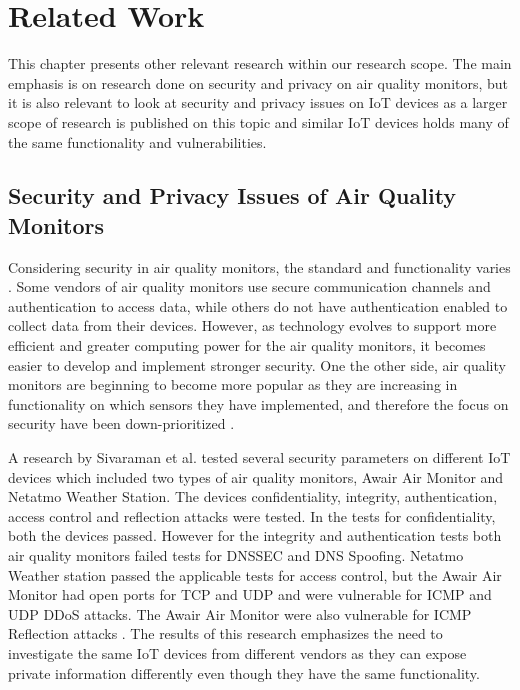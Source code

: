 \chapter{Related Work}
This chapter presents other relevant research within our research scope. The main emphasis is on research done on security and privacy on air quality monitors, but it is also relevant to look at security and privacy issues on \gls{IoT} devices as a larger scope of research is published on this topic and similar \gls{IoT} devices holds many of the same functionality and vulnerabilities.

\section{Security and Privacy Issues of Air Quality Monitors}
Considering security in air quality monitors, the standard and functionality varies \cite{AQMHowFarFunctionality}. Some vendors of air quality monitors use secure communication channels and authentication to access data, while others do not have authentication enabled to collect data from their devices. However, as technology evolves to support more efficient and greater computing power for the air quality monitors, it becomes easier to develop and implement stronger security. One the other side, air quality monitors are beginning to become more popular as they are increasing in functionality on which sensors they have implemented, and therefore the focus on security have been down-prioritized \cite{SecurityAndDataIntInAQM}.

A research by Sivaraman et al. \cite{IoTSecurityandPrivacyImpl} tested several security parameters on different \gls{IoT} devices which included two types of air quality monitors, Awair Air Monitor and Netatmo Weather Station. The devices confidentiality, integrity, authentication, access control and reflection attacks were tested. In the tests for confidentiality, both the devices passed. However for the integrity and authentication tests both air quality monitors failed tests for DNSSEC and DNS Spoofing. Netatmo Weather station passed the applicable tests for access control, but the Awair Air Monitor had open ports for TCP and UDP and were vulnerable for ICMP and UDP DDoS attacks. The Awair Air Monitor were also vulnerable for ICMP Reflection attacks \cite{IoTSecurityandPrivacyImpl}. The results of this research emphasizes the need to investigate the same \gls{IoT} devices from different vendors as they can expose private information differently even though they have the same functionality. 

